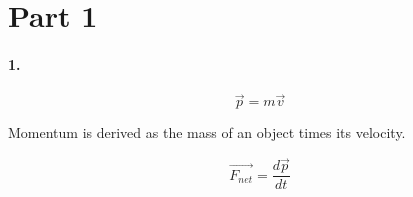 

\usepackage{enumitem}
\usepackage{graphicx}
\graphicspath{ {./lab06images/} }


\renewcommand\assignment{Lab 6: Momentum, 3/7/2023, Partners: Maite Valentin-Lugo, Seth Waln}

    \section*{Part 1}

    \paragraph*{1.}
    \begin{equation}
        \vec{p} = m\vec{v}
    \end{equation}

    Momentum is derived as the mass of an object times its velocity.

    \begin{equation}
        \vec{F_{net}} = \frac{d\vec{p}}{dt}
    \end{equation}

